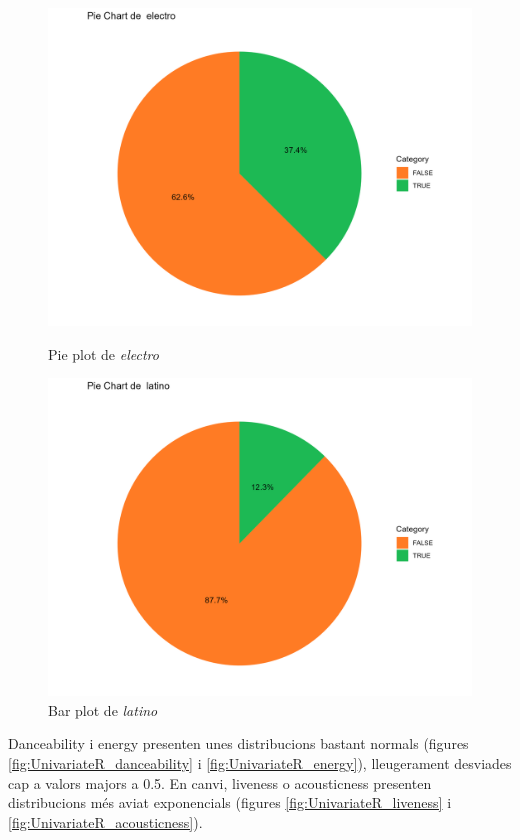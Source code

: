 \begin{figure}[H]
\centering
    \begin{minipage}{.4\textwidth}
        \centering
        \includegraphics[width=0.95\linewidth]{Images/2_Univariate/pie_electro.png}
        \caption{Pie plot de \textit{electro}}
        \label{fig:UnivariateR_electro}
    \end{minipage}%
    \begin{minipage}{.4\textwidth}
        \centering
        \includegraphics[width=0.95\linewidth]{Images/2_Univariate/pie_latino.png}
        \caption{Bar plot de \textit{latino}}
        \label{fig:UnivariateR_latino}
    \end{minipage}%
\end{figure}

Danceability i energy presenten unes distribucions bastant normals (figures \ref{fig:UnivariateR_danceability} i \ref{fig:UnivariateR_energy}), lleugerament desviades cap a valors majors a 0.5. En canvi, liveness o acousticness presenten distribucions més aviat exponencials (figures \ref{fig:UnivariateR_liveness} i \ref{fig:UnivariateR_acousticness}).


